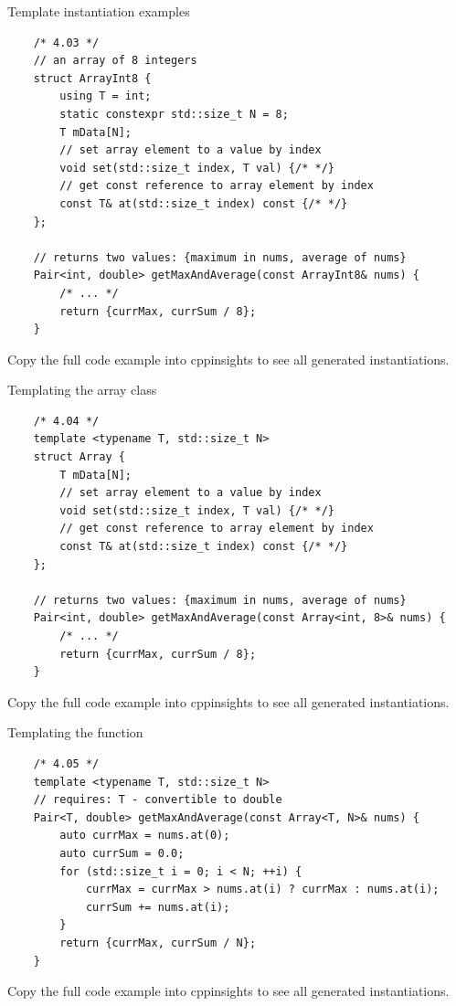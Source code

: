 \begin{frame}[fragile]{Template instantiation examples}
  \begin{verbatim}
    /* 4.03 */
    // an array of 8 integers
    struct ArrayInt8 {
        using T = int;
        static constexpr std::size_t N = 8;
        T mData[N];
        // set array element to a value by index
        void set(std::size_t index, T val) {/* */}
        // get const reference to array element by index
        const T& at(std::size_t index) const {/* */}
    };

    // returns two values: {maximum in nums, average of nums}
    Pair<int, double> getMaxAndAverage(const ArrayInt8& nums) {
        /* ... */
        return {currMax, currSum / 8};
    }
  \end{verbatim}

  Copy the full code example into cppinsights to see all generated instantiations.
\end{frame}

\begin{frame}[fragile]{Templating the array class}
  \begin{verbatim}
    /* 4.04 */
    template <typename T, std::size_t N>
    struct Array {
        T mData[N];
        // set array element to a value by index
        void set(std::size_t index, T val) {/* */}
        // get const reference to array element by index
        const T& at(std::size_t index) const {/* */}
    };

    // returns two values: {maximum in nums, average of nums}
    Pair<int, double> getMaxAndAverage(const Array<int, 8>& nums) {
        /* ... */
        return {currMax, currSum / 8};
    }
  \end{verbatim}

  Copy the full code example into cppinsights to see all generated instantiations.
\end{frame}

\begin{frame}[fragile]{Templating the function}
  \begin{verbatim}
    /* 4.05 */
    template <typename T, std::size_t N>
    // requires: T - convertible to double
    Pair<T, double> getMaxAndAverage(const Array<T, N>& nums) {
        auto currMax = nums.at(0);
        auto currSum = 0.0;
        for (std::size_t i = 0; i < N; ++i) {
            currMax = currMax > nums.at(i) ? currMax : nums.at(i);
            currSum += nums.at(i);
        }
        return {currMax, currSum / N};
    }
  \end{verbatim}

  Copy the full code example into cppinsights to see all generated instantiations.
\end{frame}


